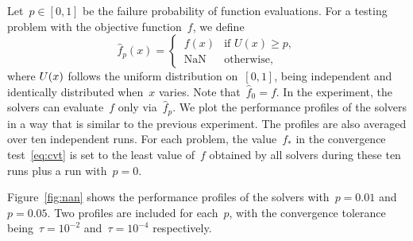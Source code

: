 \documentclass[manuscript,screen,review]{acmart}
\numberwithin{equation}{section}
\newcommand*{\iter}[1][k]{x\ifthenelse{\equal{#1}{}}{}{_{#1}}}
\newcommand*{\obj}{f}
\begin{document}
Let~$p \in [0,1]$ be the failure probability of function evaluations.
For a testing problem with the objective function~$\obj$, we define
\begin{equation}
    \label{eq:nan-obj}
    \hat{\obj}_p(x) = \begin{cases}
        \, \obj(x) & \text{if~$U(x) \ge  p$}, \\[0.5ex]
        \, \text{NaN} & \text{otherwise},
    \end{cases}
\end{equation}
where $U(\iter[])$ follows the uniform distribution on~$[0, 1]$, being independent and identically distributed when~$x$ varies.
Note that~$\hat{\obj}_0 = f$.
In the experiment, the solvers can evaluate~$\obj$ only via~$\hat{\obj}_p$.
We plot the performance profiles of the solvers in a way that is similar to the previous experiment.
The profiles are also averaged over ten independent runs.
For each problem, the value~$\obj_{\ast}$ in the convergence test~\eqref{eq:cvt} is set to the least value of~$\obj$ obtained by all solvers during these ten runs plus a run with~$p = 0$.

Figure~\ref{fig:nan} shows the performance profiles of the solvers with~$p = 0.01$ and~$p=0.05$.
Two profiles are included for each~$p$, with the convergence tolerance being~$\tau = 10^{-2}$ and~$\tau = 10^{-4}$ respectively.
\end{document}
